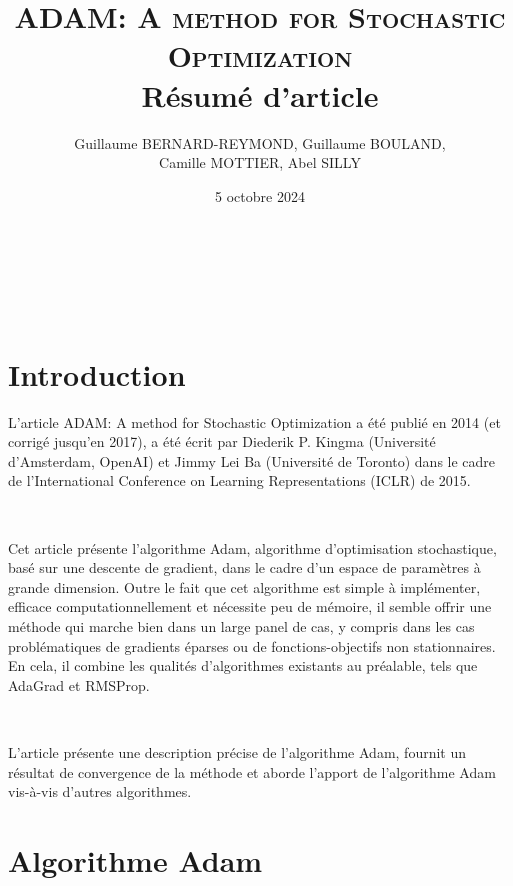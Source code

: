 \documentclass[11pt,a4paper, french]{article}
\title{\textsc{ADAM: A method for Stochastic Optimization}\\
Résumé d'article}
\author{Guillaume BERNARD-REYMOND, Guillaume BOULAND,\\ Camille MOTTIER, Abel SILLY}
\date{5 octobre 2024}
\renewcommand{\cite}[1]{\textsuperscript{\citep{#1}}}
\begin{document}
\maketitle

\


\vspace{1cm}  %
\tableofcontents
\vspace{1cm} 

\


\section{Introduction}

L'article \og ADAM: A method for Stochastic Optimization \cite{kingma2017adammethodstochasticoptimization}\fg{} a été publié en 2014 (et corrigé jusqu'en 2017),  a été écrit par Diederik P. Kingma (Université d'Amsterdam, OpenAI) et Jimmy Lei Ba (Université de Toronto) dans le cadre de l'International Conference on Learning Representations (ICLR) de 2015. 

\

Cet article présente l'algorithme Adam, algorithme d'optimisation stochastique, basé sur une descente de gradient, dans le cadre d'un espace de paramètres à grande dimension.
Outre le fait que cet algorithme est simple à implémenter, efficace computationnellement et nécessite peu de mémoire, il semble offrir une méthode qui marche bien dans un large panel de cas, y compris dans les cas problématiques de gradients éparses ou de fonctions-objectifs non stationnaires. En cela, il combine les qualités d'algorithmes existants au préalable, tels que AdaGrad et RMSProp.

\

L'article présente une description précise de l'algorithme Adam, fournit un résultat de convergence de la méthode et aborde l'apport de l'algorithme Adam vis-à-vis d'autres algorithmes. 



\section{Algorithme Adam}
\end{document}
